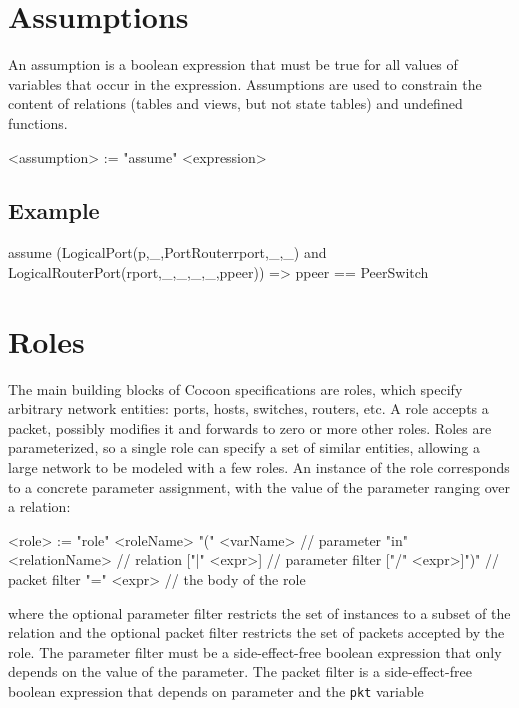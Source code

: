 \documentclass{report}
\newcommand{\src}[1]{\texttt{#1}}
\begin{document}
\section{Assumptions}

An assumption is a boolean expression that must be true for all values of variables 
that occur in the expression.  Assumptions are used to constrain the content of
relations (tables and views, but not state tables) and undefined functions.  

\begin{bnflisting}{}
<assumption> := "assume" <expression>
\end{bnflisting}

\subsection*{Example}

\begin{ccnlisting}{}
assume (LogicalPort(p,_,PortRouter{rport},_,_) and 
        LogicalRouterPort(rport,_,_,_,_,ppeer))
       => ppeer == PeerSwitch
\end{ccnlisting}

\section{Roles}

The main building blocks of Cocoon specifications are roles, 
which specify arbitrary network entities:
ports, hosts, switches, routers, etc. A role accepts a packet,
possibly modifies it and forwards to zero or more other
roles. Roles are parameterized, so a single role can specify a 
set of similar entities, allowing a large network to
be modeled with a few roles.  An instance of the role corresponds 
to a concrete parameter assignment, with the value of the parameter
ranging over a relation:
\begin{bnflisting}{}
<role> := "role" <roleName> "(" <varName>           // parameter
                                "in" <relationName> // relation
                                 ["|" <expr>]       // parameter filter
                                 ["/" <expr>]")"    // packet filter
          "=" <expr>                        // the body of the role
\end{bnflisting}
where the optional parameter filter restricts the set of instances to a subset
of the relation and the optional packet filter restricts the set of packets accepted 
by the role.  The parameter filter must be a side-effect-free boolean 
expression that only depends on the value of the parameter.  The packet
filter is a side-effect-free boolean expression that depends on parameter
and the \src{pkt} variable
\end{document}
